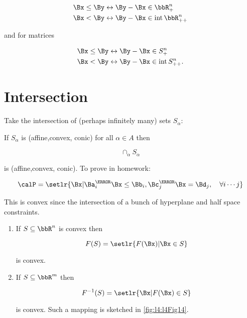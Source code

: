 \begin{equation}\label{eqn:convexOptimizationLecture4:640}
\begin{aligned}
\Bx \le \By &\leftrightarrow \By - \Bx \in \bbR^n_{+} \\
\Bx < \By   &\leftrightarrow \By - \Bx \in \interior \bbR^n_{++}
\end{aligned}
\end{equation}

and for matrices

\begin{equation}\label{eqn:convexOptimizationLecture4:660}
\begin{aligned}
\Bx \le \By &\leftrightarrow \By - \Bx \in S^n_{+} \\
\Bx < \By   &\leftrightarrow \By - \Bx \in \interior S^n_{++}.
\end{aligned}
\end{equation}

\section{Intersection}

Take the intersection of (perhaps infinitely many) sets \( S_\alpha \):

If \( S_\alpha \) is (affine,convex, conic) for all \( \alpha \in A \) then

\begin{dmath}\label{eqn:convexOptimizationLecture4:680}
\cap_\alpha S_\alpha
\end{dmath}

is (affine,convex, conic).  To prove in homework:

\begin{equation}\label{eqn:convexOptimizationLecture4:700}
\calP = \setlr{ \Bx | \Ba_i^\T \Bx \le \Bb_i, \Bc_j^\T \Bx = \Bd_j, \quad \forall i \cdots j }
\end{equation}

This is convex since the intersection of a bunch of hyperplane and half space constraints.

\begin{enumerate}
\item If \( S \subseteq \bbR^n \) is convex then

\begin{equation}\label{eqn:convexOptimizationLecture4:720}
F(S) = \setlr{ F(\Bx) | \Bx \in S }
\end{equation}

is convex.
\item If \( S \subseteq \bbR^m \) then

\begin{equation}\label{eqn:convexOptimizationLecture4:740}
F^{-1}(S) = \setlr{ \Bx | F(\Bx) \in S }
\end{equation}

is convex.  Such a mapping is sketched in \cref{fig:l4:l4Fig14}.
\end{enumerate}


\EndArticle
